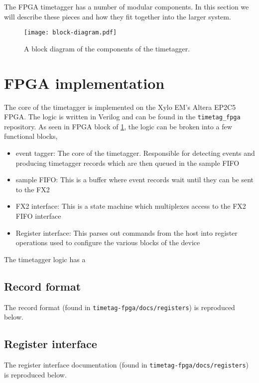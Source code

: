 The FPGA timetagger has a number of modular components. In this
section we will describe these pieces and how they fit together into
the larger system.

\begin{figure}
  \center
  \texttt{[image: block-diagram.pdf]}
  \caption{A block diagram of the components of the timetagger.}
  \label{Fig:BlockDiagram}
\end{figure}

\section{FPGA implementation}
The core of the timetagger is implemented on the Xylo EM's Altera
EP2C5 FPGA. The logic is written in Verilog and can be found in the
{\tt timetag\_fpga} repository. As seen in FPGA block of
\ref{Fig:BlockDiagram}, the logic can be broken into a few functional
blocks,

\begin{itemize}
  \item event tagger: The core of the timetagger. Responsible for
    detecting events and producing timetagger records which are then
    queued in the sample FIFO
  \item sample FIFO: This is a buffer where event records wait until
    they can be sent to the FX2
  \item FX2 interface: This is a state machine which multiplexes
    access to the FX2 FIFO interface
  \item Register interface: This parses out commands from the host
    into register operations used to configure the various blocks of
    the device
\end{itemize}

The timetagger logic has a 
\subsection{Record format}
The record format (found in {\tt timetag-fpga/docs/registers}) is reproduced below.



\subsection{Register interface}
The register interface documentation (found in
{\tt timetag-fpga/docs/registers}) is reproduced below.



